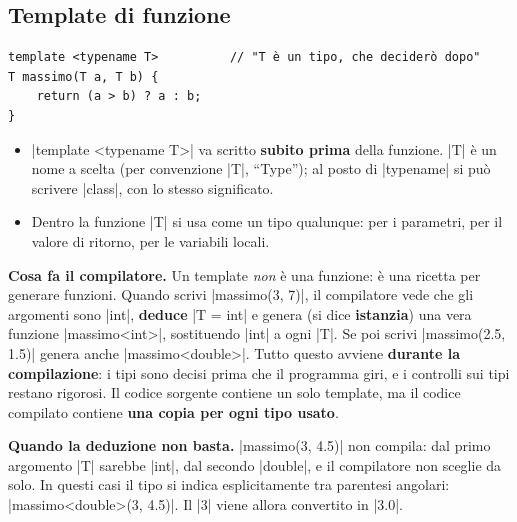 \subsection*{Template di funzione}

\begin{lstlisting}
template <typename T>          // "T è un tipo, che deciderò dopo"
T massimo(T a, T b) {
    return (a > b) ? a : b;
}
\end{lstlisting}
\begin{itemize}
  \item \cc|template <typename T>| va scritto \textbf{subito prima} della funzione.
        \cc|T| è un nome a scelta (per convenzione \cc|T|, ``Type''); al posto di
        \cc|typename| si può scrivere \cc|class|, con lo stesso significato.
  \item Dentro la funzione \cc|T| si usa come un tipo qualunque: per i parametri,
        per il valore di ritorno, per le variabili locali.
\end{itemize}

\textbf{Cosa fa il compilatore.} Un template \emph{non} è una funzione: è una
ricetta per generare funzioni. Quando scrivi \cc|massimo(3, 7)|, il compilatore
vede che gli argomenti sono \cc|int|, \textbf{deduce} \cc|T = int| e genera (si dice
\textbf{istanzia}) una vera funzione \cc|massimo<int>|, sostituendo \cc|int| a
ogni \cc|T|. Se poi scrivi \cc|massimo(2.5, 1.5)| genera anche
\cc|massimo<double>|. Tutto questo avviene \textbf{durante la compilazione}: i tipi
sono decisi prima che il programma giri, e i controlli sui tipi restano rigorosi.
Il codice sorgente contiene un solo template, ma il codice compilato contiene
\textbf{una copia per ogni tipo usato}.

\textbf{Quando la deduzione non basta.} \cc|massimo(3, 4.5)| non compila: dal
primo argomento \cc|T| sarebbe \cc|int|, dal secondo \cc|double|, e il
compilatore non sceglie da solo. In questi casi il tipo si indica esplicitamente
tra parentesi angolari: \cc|massimo<double>(3, 4.5)|. Il \cc|3| viene allora
convertito in \cc|3.0|.

